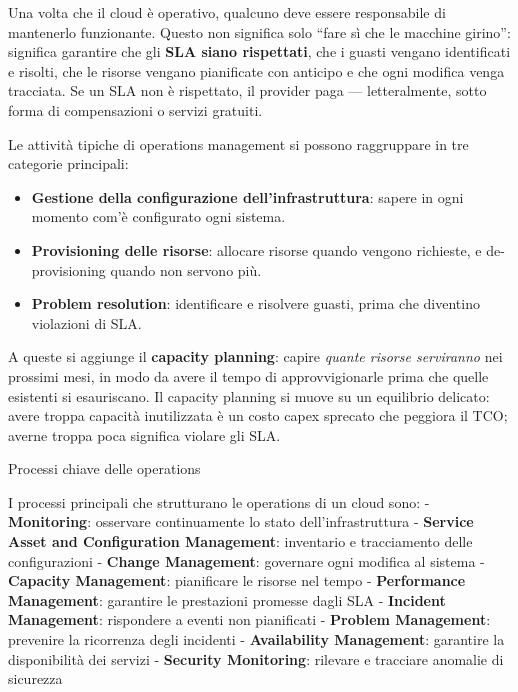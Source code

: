 \documentclass[
  italian,
  openany]{book}
\providecommand{\tightlist}{%
  \setlength{\itemsep}{0pt}\setlength{\parskip}{0pt}}
\begin{document}
Una volta che il cloud è operativo, qualcuno deve essere responsabile di
mantenerlo funzionante. Questo non significa solo ``fare sì che le
macchine girino'': significa garantire che gli \textbf{SLA siano
rispettati}, che i guasti vengano identificati e risolti, che le risorse
vengano pianificate con anticipo e che ogni modifica venga tracciata. Se
un SLA non è rispettato, il provider paga --- letteralmente, sotto forma
di compensazioni o servizi gratuiti.

Le attività tipiche di operations management si possono raggruppare in
tre categorie principali:

\begin{itemize}
\tightlist
\item
  \textbf{Gestione della configurazione dell'infrastruttura}: sapere in
  ogni momento com'è configurato ogni sistema.
\item
  \textbf{Provisioning delle risorse}: allocare risorse quando vengono
  richieste, e de-provisioning quando non servono più.
\item
  \textbf{Problem resolution}: identificare e risolvere guasti, prima
  che diventino violazioni di SLA.
\end{itemize}

A queste si aggiunge il \textbf{capacity planning}: capire \emph{quante
risorse serviranno} nei prossimi mesi, in modo da avere il tempo di
approvvigionarle prima che quelle esistenti si esauriscano. Il capacity
planning si muove su un equilibrio delicato: avere troppa capacità
inutilizzata è un costo capex sprecato che peggiora il TCO; averne
troppa poca significa violare gli SLA.

\begin{calloutnote}{Processi chiave delle operations}

I processi principali che strutturano le operations di un cloud sono: -
\textbf{Monitoring}: osservare continuamente lo stato
dell'infrastruttura - \textbf{Service Asset and Configuration
Management}: inventario e tracciamento delle configurazioni -
\textbf{Change Management}: governare ogni modifica al sistema -
\textbf{Capacity Management}: pianificare le risorse nel tempo -
\textbf{Performance Management}: garantire le prestazioni promesse dagli
SLA - \textbf{Incident Management}: rispondere a eventi non pianificati
- \textbf{Problem Management}: prevenire la ricorrenza degli incidenti -
\textbf{Availability Management}: garantire la disponibilità dei servizi
- \textbf{Security Monitoring}: rilevare e tracciare anomalie di
sicurezza

\end{calloutnote}
\end{document}
